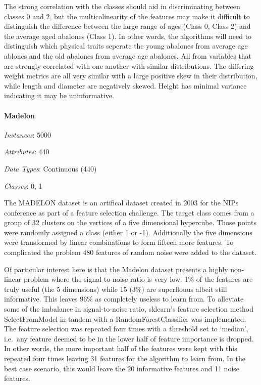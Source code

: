\documentclass[11pt]{article}
\begin{document}
The strong correlation with the classes should aid in discriminating
between classes 0 and 2, but the multicolinearity of the features may
make it difficult to distinguish the difference between the large range
of ages (Class 0, Class 2) and the average aged abalones (Class 1). In
other words, the algorithms will need to distinguish which physical
traits seperate the young abalones from average age ablones and the old
abalones from average age abalones. All from variables that are strongly
correlated with one another with similar distributions. The differing
weight metrics are all very similar with a large positive skew in their
distribution, while length and diameter are negatively skewed. Height
has minimal variance indicating it may be uninformative.

    \hypertarget{madelon}{%
\paragraph{Madelon}\label{madelon}}

    \emph{Instances}: 5000

\emph{Attributes}: 440

\emph{Data Types}: Continuous (440)

\emph{Classes}: 0, 1

The MADELON dataset is an artifical dataset created in 2003 for the NIPs
conference as part of a feature selection challenge. The target class
comes from a group of 32 clusters on the vertices of a five dimensional
hypercube. Those points were randomly assigned a class (either 1 or -1).
Additionally the five dimensions were transformed by linear combinations
to form fifteen more features. To complicated the problem 480 features
of random noise were added to the dataset.

Of particular interest here is that the Madelon dataset presents a
highly non-linear problem where the signal-to-noise ratio is very low.
1\% of the features are truly useful (the 5 dimensions) while 15 (3\%)
are superflouus albeit still informative. This leaves 96\% as completely
useless to learn from. To alleviate some of the imbalance in
signal-to-noise ratio, sklearn's feature selection method
SelectFromModel in tandem with a RandomForestClassifier was implemented.
The feature selection was repeated four times with a threshold set to
`median', i.e.~any feature deemed to be in the lower half of feature
importance is dropped. In other words, the more important half of the
features were kept with this repeated four times leaving 31 features for
the algorithm to learn from. In the best case scenario, this would leave
the 20 informative features and 11 noise features.
\end{document}
